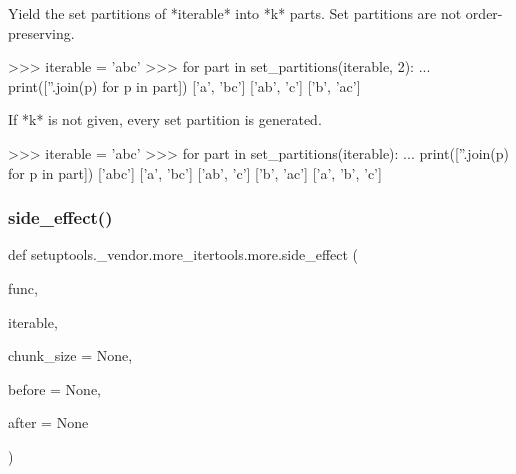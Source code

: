 \begin{DoxyVerb}Yield the set partitions of *iterable* into *k* parts. Set partitions are
not order-preserving.

>>> iterable = 'abc'
>>> for part in set_partitions(iterable, 2):
...     print([''.join(p) for p in part])
['a', 'bc']
['ab', 'c']
['b', 'ac']


If *k* is not given, every set partition is generated.

>>> iterable = 'abc'
>>> for part in set_partitions(iterable):
...     print([''.join(p) for p in part])
['abc']
['a', 'bc']
['ab', 'c']
['b', 'ac']
['a', 'b', 'c']\end{DoxyVerb}
 \mbox{\label{namespacesetuptools_1_1__vendor_1_1more__itertools_1_1more_ad8e7e1181b4034e1287ca835880ab196}} 
\subsubsection{\texorpdfstring{side\+\_\+effect()}{side\_effect()}}
{\footnotesize\ttfamily def setuptools.\+\_\+vendor.\+more\+\_\+itertools.\+more.\+side\+\_\+effect (\begin{DoxyParamCaption}\item[{}]{func,  }\item[{}]{iterable,  }\item[{}]{chunk\+\_\+size = {\ttfamily None},  }\item[{}]{before = {\ttfamily None},  }\item[{}]{after = {\ttfamily None} }\end{DoxyParamCaption})}

